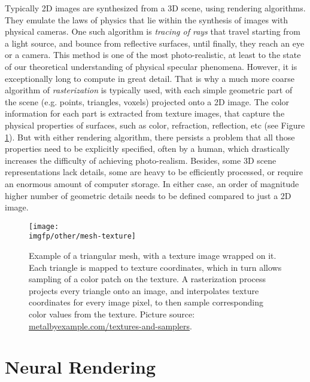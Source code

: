 Typically 2D images are synthesized from a 3D scene, using rendering algorithms. They emulate the laws of physics that lie within the synthesis of images with physical cameras. One such algorithm is \textit{tracing of rays} that travel starting from a light source, and bounce from reflective surfaces, until finally, they reach an eye or a camera. This method is one of the most photo-realistic, at least to the state of our theoretical understanding of physical specular phenomena. However, it is exceptionally long to compute in great detail. That is why a much more coarse algorithm of \textit{rasterization} is typically used, with each simple geometric part of the scene (e.g. points, triangles, voxels) projected onto a 2D image. The color information for each part is extracted from texture images, that capture the physical properties of surfaces, such as color, refraction, reflection, etc (see Figure \ref{intro:fig:mesh-texture}). But with either rendering algorithm, there persists a problem that all those properties need to be explicitly specified, often by a human, which drastically increases the difficulty of achieving photo-realism. Besides, some 3D scene representations lack details, some are heavy to be efficiently processed, or require an enormous amount of computer storage. In either case, an order of magnitude higher number of geometric details needs to be defined compared to just a 2D image. 

\begin{figure}[h!]
	\centering
	\texttt{[image: \\imgfp/other/mesh-texture]}
	\caption{Example of a triangular mesh, with a texture image wrapped on it. Each triangle is mapped to texture coordinates, which in turn allows sampling of a color patch on the texture. A rasterization process projects every triangle onto an image, and interpolates texture coordinates for every image pixel, to then sample corresponding color values from the texture. Picture source: \href{https://metalbyexample.com/textures-and-samplers/}{metalbyexample.com/textures-and-samplers}.}
	\label{intro:fig:mesh-texture}
\end{figure}


\section{Neural Rendering}\label{intro:nrender}

